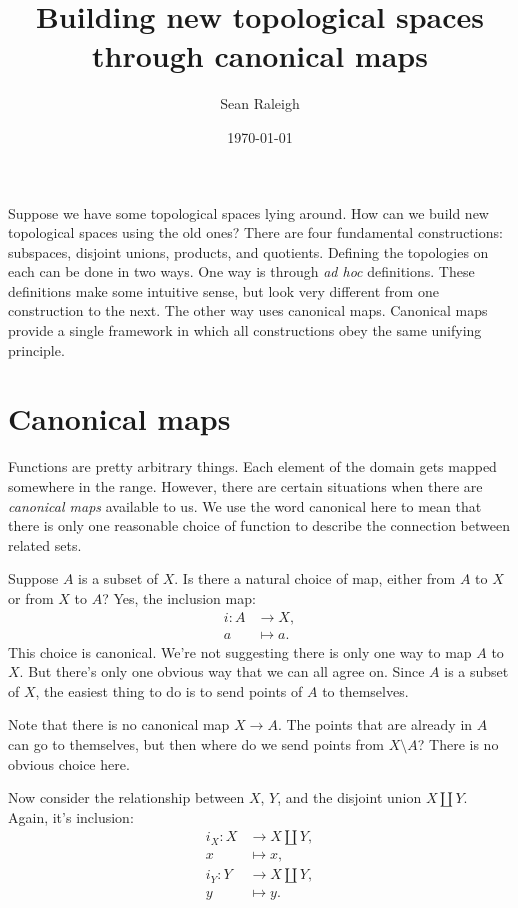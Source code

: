 \documentclass[12pt]{article}
\title{Building new topological spaces through canonical maps}
\author{Sean Raleigh}
\date{\today}
\begin{document}
\maketitle

Suppose we have some topological spaces lying around. How can we build new topological spaces using the old ones? There are four fundamental constructions: subspaces, disjoint unions, products, and quotients. Defining the topologies on each can be done in two ways. One way is through \textit{ad hoc} definitions. These definitions make some intuitive sense, but look very different from one construction to the next. The other way uses canonical maps. Canonical maps provide a single framework in which all constructions obey the same unifying principle.

\section{Canonical maps}

Functions are pretty arbitrary things. Each element of the domain gets mapped somewhere in the range. However, there are certain situations when there are \emph{canonical maps} available to us. We use the word canonical here to mean that there is only one reasonable choice of function to describe the connection between related sets.

Suppose $A$ is a subset of $X$. Is there a natural choice of map, either from $A$ to $X$ or from $X$ to $A$? Yes, the inclusion map:
\begin{align*}
	i: A &\to X,	\\
	   a &\mapsto a.
\end{align*}
This choice is canonical. We're not suggesting there is only one way to map $A$ to $X$. But there's only one obvious way that we can all agree on. Since $A$ is a subset of $X$, the easiest thing to do is to send points of $A$ to themselves.

Note that there is no canonical map $X \to A$. The points that are already in $A$ can go to themselves, but then where do we send points from $X \setminus A$? There is no obvious choice here.

Now consider the relationship between $X$, $Y$, and the disjoint union $X \amalg Y$. Again, it's inclusion:
\begin{align*}
	i_{X}: X &\to X \amalg Y,		\\
    	   x &\mapsto x,				\\
    i_{Y}: Y &\to X \amalg Y,		\\
    	   y &\mapsto y.
\end{align*}
\end{document}
